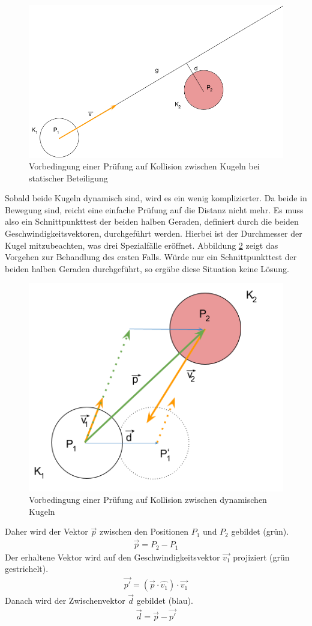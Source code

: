 \begin{figure}[h!]
    \begin{center}
        \includegraphics[width=0.4\linewidth]{../common/03_billiard_ai/resources/24_vorbedingung_kugelkollision_statisch.png}
    \end{center}
    \caption{Vorbedingung einer Prüfung auf Kollision zwischen Kugeln bei statischer Beteiligung}
    \label{fig:kugelkollision_vorbedingung_statisch}
\end{figure}

Sobald beide Kugeln dynamisch sind, wird es ein wenig komplizierter. Da beide in Bewegung sind, reicht eine einfache
Prüfung auf die Distanz nicht mehr. Es muss also ein Schnittpunkttest der beiden halben Geraden, definiert durch die
beiden Geschwindigkeitsvektoren, durchgeführt werden. Hierbei ist der Durchmesser der Kugel mitzubeachten, was drei
Spezialfälle eröffnet.
Abbildung \ref{fig:kugelkollision_vorbedingung_dynamisch} zeigt das Vorgehen zur Behandlung des ersten Falls.
Würde nur ein Schnittpunkttest der beiden halben Geraden durchgeführt, so ergäbe diese Situation keine Lösung.
\begin{figure}[h!]
    \begin{center}
        \includegraphics[width=0.4\linewidth]{../common/03_billiard_ai/resources/25_vorbedingung_kugelkollision_dynamisch.png}
    \end{center}
    \caption{Vorbedingung einer Prüfung auf Kollision zwischen dynamischen Kugeln}
    \label{fig:kugelkollision_vorbedingung_dynamisch}
\end{figure}

Daher wird der Vektor $\vec{p}$ zwischen den Positionen $P_1$ und $P_2$ gebildet (grün).
\begin{align}
    \vec{p} = P_2 - P_1
\end{align}
Der erhaltene Vektor wird auf den Geschwindigkeitsvektor $\vec{v_1}$ projiziert (grün gestrichelt).
\begin{align}
    \vec{p'} = (\vec{p} \cdot \hat{v_1}) \cdot \vec{v_1}
\end{align}
Danach wird der Zwischenvektor $\vec{d}$ gebildet (blau).
\begin{align}
    \vec{d} = \vec{p} - \vec{p'}
\end{align}

